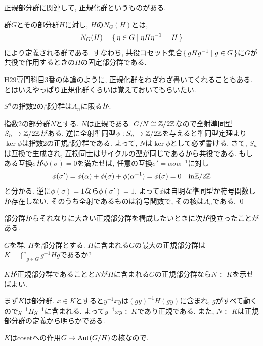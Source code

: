 正規部分群に関連して, 正規化群というものがある.
\begin{defn}
群$G$とその部分群$H$に対し, $H$の$N_{G}(H)$とは,
\[N_{G}(H) = \set{\eta\in G \mid \eta H \eta^{-1} = H}\]
により定義される群である. すなわち, 共役コセット集合$\set{gHg^{-1} \mid g\in G}$に$G$が共役で作用するときの$H$の固定部分群である.
\end{defn}

\begin{tips} H29専門科目3番の体論のように, 正規化群をわざわざ書いてくれることもある.  とはいえやっぱり正規化群くらいは覚えておいてもらいたい.
\end{tips}

\begin{egprob}
$S^n$の指数2の部分群は$A_n$に限るか.
\end{egprob}

\begin{egans} 指数2の部分群$N$とする. $N$は正規である. $G/N\cong \mathbb{Z}/2\mathbb{Z}$なので全射準同型$S_n \to \mathbb{Z}/2\mathbb{Z}$がある. 逆に全射準同型$\phi : S_n \to \mathbb{Z}/2\mathbb{Z}$を与えると準同型定理より$\ker{\phi}$は指数2の正規部分群である. よって, $N$は$\ker{\phi}$として必ず書ける. さて, $S_n$は互換で生成され, 互換同士はサイクルの型が同じであるから共役である. もしある互換$\sigma$が$\phi(\sigma) = 0$を満たせば, 任意の互換$\sigma' = \alpha \sigma \alpha^{-1} $に対し
\[\phi(\sigma') = \phi(\alpha) + \phi(\sigma) + \phi(\alpha^{-1}) = \phi(\sigma) = 0\quad \mathrm{in} \mathbb{Z}/2\mathbb{Z}\]
と分かる. 逆に$\phi(\sigma) = 1$なら$\phi(\sigma') = 1$. よって$\phi$は自明な準同型か符号関数しか存在しない. そのうち全射であるものは符号関数で, その核は$A_n$である. \qed
\end{egans}

部分群からそれなりに大きい正規部分群を構成したいときに次が役立ったことがある.
\begin{egprob}
$G$を群, $H$を部分群とする. $H$に含まれる$G$の最大の正規部分群は$K=\bigcap_{g\in G}g^{-1}Hg$であるか?
\end{egprob}
\begin{egans}
$K$が正規部分群であることと$N$が$H$に含まれる$G$の正規部分群なら$N\subset K$を示せばよい.\par
まず$K$は部分群. $x\in K$とすると$y^{-1}xy$は$(gy)^{-1}H(gy)$に含まれ, $g$がすべて動くので$g^{-1}Hg^{-1}$に含まれる. よって$y^{-1}xy\in K$であり正規である. また, $N\subset K$は正規部分群の定義から明らかである.
\end{egans}
\begin{egans}
$K$はcosetへの作用$G\to \mathrm{Aut}(G/H)$の核なので.
\end{egans}


